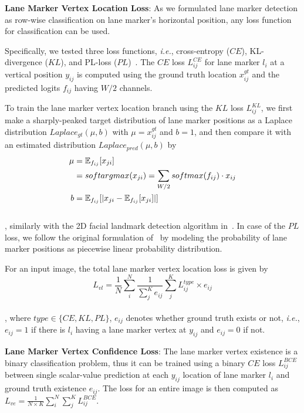 \documentclass[10pt,twocolumn,letterpaper]{article}
\begin{document}
\textbf{Lane Marker Vertex Location Loss}:
As we formulated lane marker detection as row-wise classification on lane marker's horizontal position, any loss function for classification can be used.

Specifically, we tested three loss functions, \textit{i.e.}, cross-entropy ($CE$), KL-divergence ($KL$), and PL-loss ($PL$)~\cite{StixelNet}. The $CE$ loss $L_{ij}^{CE}$ for lane marker $l_i$ at a vertical position $y_{ij}$ is computed using the ground truth location $x_{ij}^{gt}$ and the predicted logits $f_{ij}$ having $W/2$ channels. 

To train the lane marker vertex location branch using the $KL$ loss $L_{ij}^{KL}$, we first make a sharply-peaked target distribution of lane marker positions as a Laplace distribution $Laplace_{gt}(\mu, b)$ with $\mu=x_{ij}^{gt}$ and $b=1$, and then compare it with an estimated distribution $Laplace_{pred}(\mu, b)$ by 
\begin{equation}
	\vspace{-2.px}
	\begin{split}
		\mu & =\mathbb{E}_{f_{ij}}[x_{ji}] \\
		& = softargmax(x_{ji})=\sum_{W/2} softmax(f_{ij}) \cdot x_{ij}\\
		b & =\mathbb{E}_{f_{ij}}[|x_{ji}-\mathbb{E}_{f_{ij}}[x_{ji}]|]
	\end{split}
	\label{eq:softargmax}
	\vspace{-2.px}
\end{equation} \\
, similarly with the 2D facial landmark detection algorithm in~\cite{laplace_lm, laplace_gradient_approx}. In case of the $PL$ loss, we follow the original formulation of~\cite{StixelNet} by modeling the probability of lane marker positions as piecewise linear probability distribution.


For an input image, the total lane marker vertex location loss is given by 
\begin{equation}
	L_{vl}=\frac{1}{N} \sum_i^{N} \frac{1}{\sum_j^K e_{ij}} \sum_j^K L_{ij}^{type}\times e_{ij}
\end{equation} \\
, where $type \in \{CE, KL, PL\}$, $e_{ij}$ denotes whether ground truth exists or not, \textit{i.e.}, $e_{ij}=1$ if there is $l_i$ having a lane marker vertex at $y_{ij}$ and $e_{ij}=0$ if not.
\vspace{4.px}

\textbf{Lane Marker Vertex Confidence Loss}:
The lane marker vertex existence is a binary classification problem, thus it can be trained using a binary $CE$ loss $L_{ij}^{BCE}$ between single scalar-value prediction at each $y_{ij}$ location of lane marker $l_i$ and ground truth existence $e_{ij}$. The loss for an entire image is then computed as $L_{ve}=\frac{1}{N \times K} \sum_i^{N} \sum_j^K L_{ij}^{BCE}$.
\vspace{4.px}
\end{document}
